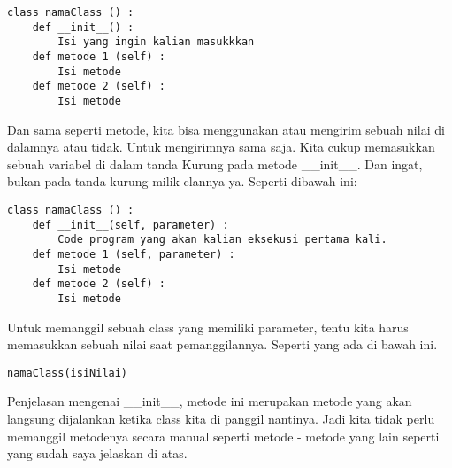\begin{lstlisting}
class namaClass () :
    def __init__() :
        Isi yang ingin kalian masukkkan
    def metode 1 (self) :
        Isi metode
    def metode 2 (self) :
        Isi metode
\end{lstlisting}
Dan sama seperti metode, kita bisa menggunakan atau mengirim sebuah nilai di dalamnya atau tidak. Untuk mengirimnya sama saja. Kita cukup memasukkan sebuah variabel di dalam tanda Kurung pada metode \_\_init\_\_. Dan ingat, bukan pada tanda kurung milik clannya ya. Seperti dibawah ini:
\begin{lstlisting}
class namaClass () :
    def __init__(self, parameter) :
        Code program yang akan kalian eksekusi pertama kali.
    def metode 1 (self, parameter) :
        Isi metode
    def metode 2 (self) :
        Isi metode
\end{lstlisting}
Untuk memanggil sebuah class yang memiliki parameter, tentu kita harus memasukkan sebuah nilai saat pemanggilannya. Seperti yang ada di bawah ini.
\begin{lstlisting}
namaClass(isiNilai)
\end{lstlisting}
Penjelasan mengenai \_\_init\_\_, metode ini merupakan metode yang akan langsung dijalankan ketika class kita di panggil nantinya. Jadi kita tidak perlu memanggil metodenya secara manual seperti metode - metode yang lain seperti yang sudah saya jelaskan di atas.
